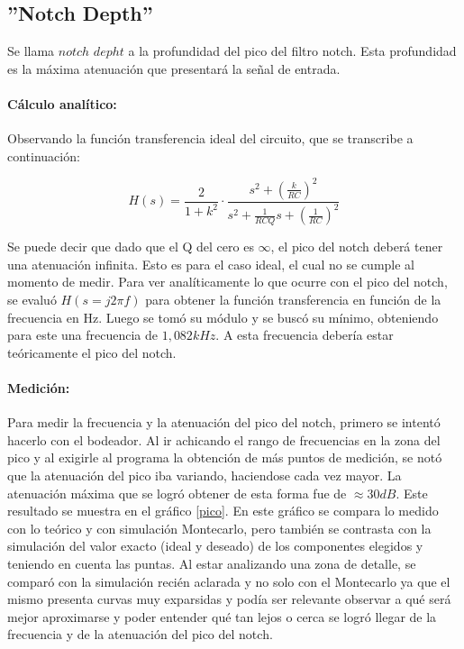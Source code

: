 \subsection{ ''Notch Depth''}

Se llama $notch$  $depht$ a la profundidad del pico del filtro notch. Esta profundidad es la m\'axima atenuaci\'on que presentar\'a la se\~nal de entrada.

\paragraph*{C\'alculo anal\'itico:} Observando la funci\'on transferencia ideal del circuito, que se transcribe a continuaci\'on:

\begin{equation}
H(s) = \frac{2}{1+k^2} \cdot \frac{s^2 + \left( \frac{k}{RC}\right)^2}{s^2 + \frac{1}{RCQ} s + \left(\frac{1}{RC}\right)^2}
\label{vovi_simple2}
\end{equation}

Se puede decir que dado que el Q del cero es $\infty$, el pico del notch deber\'a tener una atenuaci\'on infinita. Esto es para el caso ideal, el cual no se cumple al momento de medir. Para ver anal\'iticamente lo que ocurre con el pico del notch, se evalu\'o $H(s=j2\pi f)$ para obtener la funci\'on transferencia en funci\'on de la frecuencia en Hz. Luego se tom\'o su m\'odulo y se busc\'o su m\'inimo, obteniendo para este una frecuencia de $1,082kHz$. A esta frecuencia deber\'ia estar te\'oricamente el pico del notch.

\paragraph*{Medici\'on:} Para medir la frecuencia y la atenuaci\'on del pico del notch, primero se intent\'o hacerlo con el bodeador. Al ir achicando el rango de frecuencias en la zona del pico y al exigirle al programa la obtenci\'on de m\'as puntos de medici\'on, se not\'o que la atenuaci\'on del pico iba variando, haciendose cada vez mayor. La atenuaci\'on m\'axima que se logr\'o obtener de esta forma fue de $\approx 30dB$. Este resultado se muestra en el gr\'afico \ref{pico}. En este gr\'afico se compara lo medido con lo te\'orico y con simulaci\'on Montecarlo, pero tambi\'en se contrasta con la simulaci\'on del valor exacto (ideal y deseado) de los componentes elegidos y teniendo en cuenta las puntas. Al estar analizando una zona de detalle, se compar\'o con la simulaci\'on reci\'en aclarada y no solo con el Montecarlo ya que el mismo presenta curvas muy exparsidas y pod\'ia ser relevante observar a qu\'e ser\'a mejor aproximarse y poder entender qu\'e tan lejos o cerca se logr\'o llegar de la frecuencia y de la atenuaci\'on del pico del notch.

